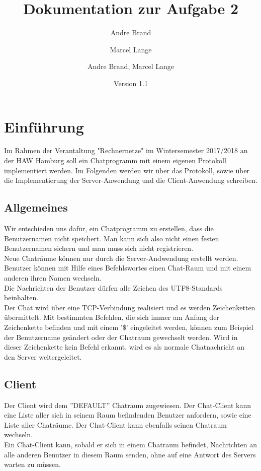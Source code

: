 \documentclass[a4paper, oneside]{scrreprt}
\author{Andre Brand}
\author{Marcel Lange}
\begin{document}
    \title{Dokumentation zur Aufgabe 2}
	\author{Andre Brand, Marcel Lange}
    \date{Version 1.1}
    \subject{Praktikum Rechnernetze}
    \maketitle

	\renewcommand{\contentsname}{Inhaltsverzeichnis}
    \tableofcontents

\chapter{Einführung}
Im Rahmen der Verantaltung "Rechnernetze" im Wintersemester 2017/2018 an der HAW Hamburg soll ein Chatprogramm mit einem eigenen Protokoll implementiert werden.
Im Folgenden werden wir über das Protokoll, sowie über die Implementierung der Server-Anwendung und die Client-Anwendung schreiben. 

\section{Allgemeines}
Wir entschieden uns dafür, ein Chatprogramm zu erstellen, dass die Benutzernamen nicht speichert. Man kann sich also nicht einen festen Benutzernamen sichern und man muss sich nicht registrieren.
\\Neue Chaträume können nur durch die Server-Andwendung erstellt werden. Benutzer können mit Hilfe eines Befehlswortes einen Chat-Raum und mit einem anderen ihren Namen wechseln.  
\\Die Nachrichten der Benutzer dürfen alle Zeichen des UTF8-Standards beinhalten.
\\Der Chat wird über eine TCP-Verbindung realisiert und es werden Zeichenketten übermittelt. Mit bestimmten Befehlen, die sich immer am Anfang der Zeichenkette befinden und mit einem '\$' eingeleitet werden, können zum Beispiel der Benutzername geändert oder der Chatraum gewechselt werden. Wird in dieser Zeichenkette kein Befehl erkannt, wird es als normale Chatnachricht an den Server weitergeleitet.

\section{Client}
Der Client wird dem ''DEFAULT'' Chatraum zugewiesen. Der Chat-Client kann eine Liste aller
sich in seinem Raum befindenden Benutzer anfordern, sowie eine Liste aller Chaträume. Der
Chat-Client kann ebenfalls seinen Chatraum wechseln.
\\Ein Chat-Client kann, sobald er sich in einem Chatraum befindet, Nachrichten an alle anderen
Benutzer in diesem Raum senden, ohne auf eine Antwort des Servers warten zu müssen.
\newpage
\end{document}
